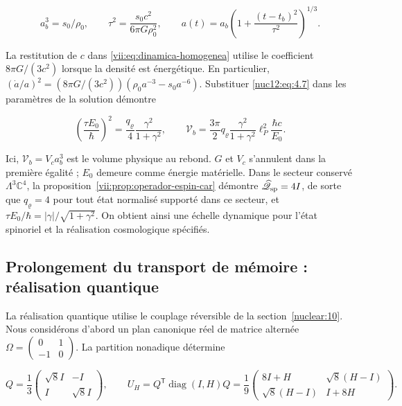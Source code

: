 \[
a_b^3=s_0/\rho_0,\qquad
\tau^2=\frac{s_0c^2}{6\pi G\rho_0^2},\qquad
a(t)=a_b\left(1+\frac{(t-t_b)^2}{\tau^2}\right)^{1/3}.
\]



La restitution de \(c\) dans \eqref{vii:eq:dinamica-homogenea} utilise le coefficient \(8\pi G/(3c^2)\) lorsque la densité est énergétique. En particulier, \((\dot a/a)^2=(8\pi G/(3c^2))(\rho_0a^{-3}-s_0a^{-6})\). Substituer \eqref{nuc12:eq:4.7} dans les paramètres de la solution démontre



\begin{equation}
\boxed{\left(\frac{\tau E_0}{\hbar}\right)^2
=\frac{q_\varrho}{4}\frac{\gamma^2}{1+\gamma^2},\qquad
\mathcal V_b=\frac{3\pi}{2}q_\varrho
\frac{\gamma^2}{1+\gamma^2}\ell_P^2\frac{\hbar c}{E_0}.}
\label{nuc12:eq:4.8}
\end{equation}



Ici, \(\mathcal V_b=V_c a_b^3\) est le volume physique au rebond. \(G\) et \(V_c\) s’annulent dans la première égalité ; \(E_0\) demeure comme énergie matérielle. Dans le secteur conservé \(\Lambda^3\mathbb C^4\), la proposition~\ref{vii:prop:operador-espin-car} démontre \(\widehat{\mathscr Q}_{\rm sp}=4I\), de sorte que \(q_\varrho=4\) pour tout état normalisé supporté dans ce secteur, et
\(\tau E_0/\hbar=|\gamma|/\sqrt{1+\gamma^2}\).
On obtient ainsi une échelle dynamique pour l’état spinoriel et la réalisation cosmologique spécifiés.


\subsection{Prolongement du transport de mémoire : réalisation quantique}

La réalisation quantique utilise le couplage réversible de la section~\ref{nuclear:10}. Nous considérons d’abord un plan canonique réel de matrice alternée \(\Omega=\left(\begin{smallmatrix}0&1\\-1&0\end{smallmatrix}\right)\). La partition nonadique détermine



\begin{equation}
Q=\frac13\begin{pmatrix}\sqrt8 I&-I\\I&\sqrt8 I\end{pmatrix},\qquad
U_H=Q^{\mathsf T}\operatorname{diag}(I,H)Q
=\frac19\begin{pmatrix}8I+H&\sqrt8(H-I)\\
\sqrt8(H-I)&I+8H\end{pmatrix}.
\label{nuc12:eq:5.1}
\end{equation}




